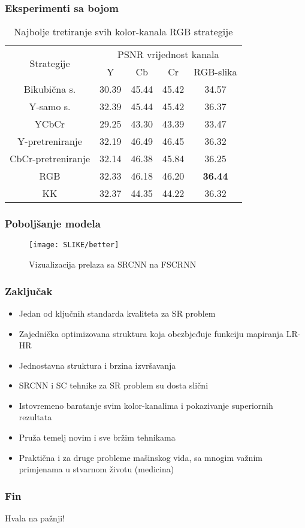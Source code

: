 \documentclass{beamer}
\begin{document}
\begin{frame}
\frametitle{Eksperimenti sa bojom}

\begin{table}[h!]
\centering
\begin{tabular}{ |c|c|c|c|c| } 
\hline
\multirow{2}{*}{Strategije}&\multicolumn{4}{|c|}{PSNR vrijednost kanala}\\
\cline{2-5}
&Y & Cb & Cr & RGB-slika\\ 
\hline
Bikubična s. & 30.39 & 45.44 & 45.42 & 34.57 \\
Y-samo s. & 32.39 & 45.44 & 45.42 & 36.37 \\
YCbCr & 29.25 & 43.30 & 43.39 & 33.47 \\
Y-pretreniranje & 32.19 & 46.49 & 46.45 & 36.32 \\
CbCr-pretreniranje & 32.14 & 46.38 & 45.84 & 36.25 \\
RGB & 32.33 & 46.18 & 46.20 & \textbf{36.44} \\
KK & 32.37 & 44.35 & 44.22 & 36.32 \\
\hline
\end{tabular}
\caption{Najbolje tretiranje svih kolor-kanala RGB strategije}
\label{table:2}
\end{table}

\end{frame}


\begin{frame}
\frametitle{Poboljšanje modela}

 \begin{figure}[h]
\texttt{[image: SLIKE/better]}
\centering
\caption{Vizualizacija prelaza sa SRCNN na FSCRNN}
\label{fig:improv_1}
\end{figure}

\end{frame}

\begin{frame}
\frametitle{Zaključak}

\begin{itemize}
\item Jedan od ključnih standarda kvaliteta za SR problem
\item Zajednička optimizovana struktura koja obezbjeđuje funkciju mapiranja LR-HR
\item Jednostavna struktura i brzina izvršavanja
\item SRCNN i SC tehnike za SR problem su dosta slični
\item Istovremeno baratanje svim kolor-kanalima i pokazivanje superiornih rezultata
\item Pruža temelj novim i sve bržim tehnikama
\item Praktična i za druge probleme mašinskog vida, sa mnogim važnim primjenama u stvarnom životu (medicina)
\end{itemize} 

\end{frame}


\begin{frame}
\frametitle{Fin}

Hvala na pažnji!
 

\end{frame}
\end{document}
